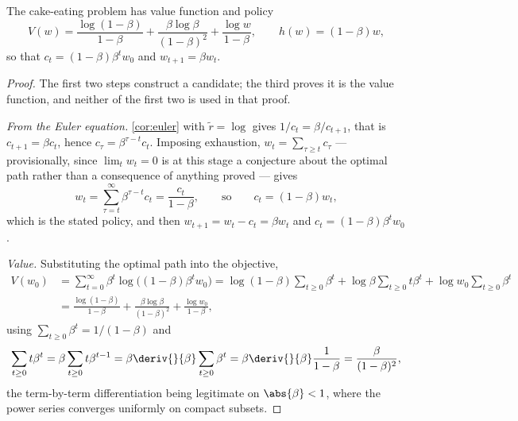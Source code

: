 \begin{proposition}\label{prop:cake-solution}
	The cake-eating problem has value function and policy
	\begin{equation}\label{eq:cake-solution}
		V(w)=\frac{\log(1-\beta)}{1-\beta}+\frac{\beta\log\beta}{(1-\beta)^{2}}
		+\frac{\log w}{1-\beta},
		\qquad
		h(w)=(1-\beta)w,
	\end{equation}
	so that $c_t=(1-\beta)\beta^{t}w_0$ and $w_{t+1}=\beta w_t$.
\end{proposition}

\begin{proof}
	The first two steps construct a candidate; the third proves it is the value
	function, and neither of the first two is used in that proof.

	\emph{From the Euler equation.} \autoref{cor:euler} with
	$\tilde r=\log$ gives $1/c_t=\beta/c_{t+1}$, that is $c_{t+1}=\beta c_t$, hence
	$c_\tau=\beta^{\tau-t}c_t$. Imposing exhaustion,
	$w_t=\sum_{\tau\geq t}c_\tau$ --- provisionally, since $\lim_tw_t=0$ is at this
	stage a conjecture about the optimal path rather than a consequence of anything
	proved --- gives
	\[
		w_t=\sum_{\tau=t}^{\infty}\beta^{\tau-t}c_t=\frac{c_t}{1-\beta},
		\qquad\text{so}\qquad c_t=(1-\beta)w_t,
	\]
	which is the stated policy, and then $w_{t+1}=w_t-c_t=\beta w_t$ and
	$c_t=(1-\beta)\beta^{t}w_0$.

	\emph{Value.} Substituting the optimal path into the objective,
	\begin{align*}
		V(w_0) & =\sum_{t=0}^{\infty}\beta^{t}\log\bigl((1-\beta)\beta^{t}w_0\bigr)
		=\log(1-\beta)\sum_{t\geq0}\beta^{t}
		+\log\beta\sum_{t\geq0}t\beta^{t}
		+\log w_0\sum_{t\geq0}\beta^{t}                                            \\
		       & =\frac{\log(1-\beta)}{1-\beta}+\frac{\beta\log\beta}{(1-\beta)^{2}}
		+\frac{\log w_0}{1-\beta},
	\end{align*}
	using $\sum_{t\geq0}\beta^{t}=1/(1-\beta)$ and
	\[
		\sum_{t\geq0}t\beta^{t}=\beta\sum_{t\geq0}t\beta^{t-1}
		=\beta\deriv{}{\beta}\sum_{t\geq0}\beta^{t}
		=\beta\deriv{}{\beta}\frac{1}{1-\beta}=\frac{\beta}{(1-\beta)^{2}},
	\]
	the term-by-term differentiation being legitimate on $\abs{\beta}<1$, where the
	power series converges uniformly on compact subsets.


\end{proof}
